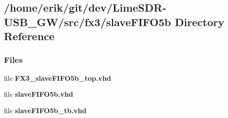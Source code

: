 \subsection{/home/erik/git/dev/\+Lime\+S\+D\+R-\/\+U\+S\+B\+\_\+\+G\+W/src/fx3/slave\+F\+I\+F\+O5b Directory Reference}
\label{dir_29a8a1907e0801c21a8805da9faa32ca}
\subsubsection*{Files}
\begin{DoxyCompactItemize}
\item 
file {\bf F\+X3\+\_\+slave\+F\+I\+F\+O5b\+\_\+top.\+vhd}
\item 
file {\bf slave\+F\+I\+F\+O5b.\+vhd}
\item 
file {\bf slave\+F\+I\+F\+O5b\+\_\+tb.\+vhd}
\end{DoxyCompactItemize}
